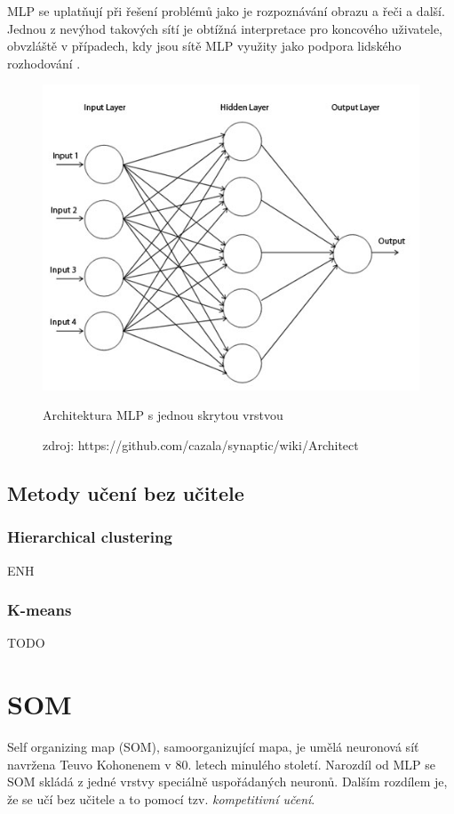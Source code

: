 \documentclass[thesis=M,czech]{FITthesis}[2012/06/26]
\begin{document}
MLP se uplatňují při řešení problémů jako je rozpoznávání obrazu a řeči a další. Jednou z nevýhod takových sítí je obtížná interpretace pro koncového uživatele, obvzláště v případech, kdy jsou sítě MLP využity jako podpora lidského rozhodování \cite{needed}. 



\begin{figure}[htbp]
\begin{center}
	\includegraphics[scale=0.6]{mlp.jpeg}
\caption{Architektura MLP s jednou skrytou vrstvou}
\label{fig:mlp}
\end{center}
  \caption*{zdroj: https://github.com/cazala/synaptic/wiki/Architect}
\end{figure}

 
 \subsection{Metody učení bez učitele}
  \subsubsection*{Hierarchical clustering}
  ENH
  \subsubsection*{K-means}
 TODO
\section{SOM}
Self organizing map (SOM), samoorganizující mapa, je umělá neuronová síť navržena Teuvo Kohonenem v 80. letech minulého století. Narozdíl od MLP se SOM skládá z jedné vrstvy speciálně uspořádaných neuronů. Dalším rozdílem je, že se učí bez učitele a to pomocí tzv. \textit{kompetitivní učení}.\cite{junkie}
\end{document}
